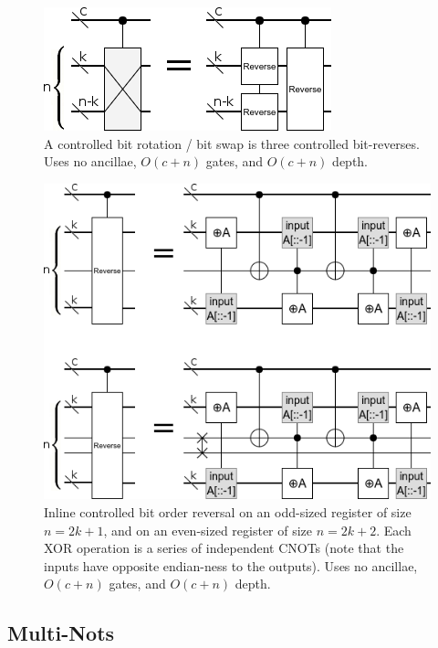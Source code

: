 \documentclass[twocolumn,longbibliography]{quantumarticle}
\begin{document}
\begin{figure}
  \centering
  \includegraphics[width=\linewidth]{assets/controlled-bit-rotate.png}
  \caption{
    A controlled bit rotation / bit swap is three controlled bit-reverses.
    Uses no ancillae, $O(c + n)$ gates, and $O(c + n)$ depth.
  }
  \label{fig:bit-rotate}
\end{figure}

\begin{figure}
  \centering
  \includegraphics[width=\linewidth]{assets/controlled-reverse.png}
  \caption{
    Inline controlled bit order reversal on an odd-sized register of size $n=2k+1$, and on an even-sized register of size $n=2k+2$.
    Each XOR operation is a series of independent CNOTs (note that the inputs have opposite endian-ness to the outputs).
    Uses no ancillae, $O(c + n)$ gates, and $O(c + n)$ depth.
  }
  \label{fig:bit-reverse}
\end{figure}


\subsection{Multi-Nots}
\end{document}
